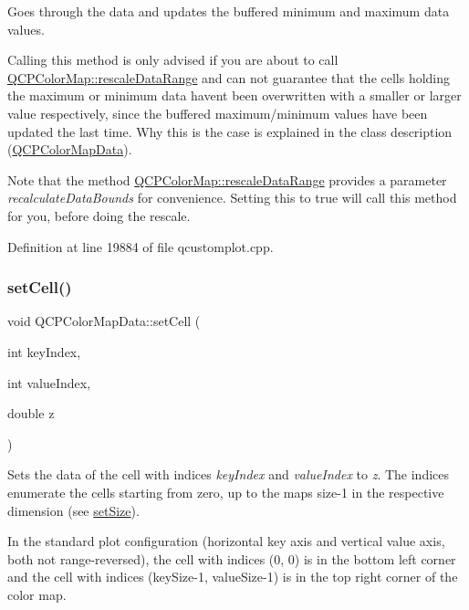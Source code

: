 Goes through the data and updates the buffered minimum and maximum data values.

Calling this method is only advised if you are about to call \hyperlink{class_q_c_p_color_map_a856608fa3dd1cc290bcd5f29a5575774}{Q\+C\+P\+Color\+Map\+::rescale\+Data\+Range} and can not guarantee that the cells holding the maximum or minimum data haven\textquotesingle{}t been overwritten with a smaller or larger value respectively, since the buffered maximum/minimum values have been updated the last time. Why this is the case is explained in the class description (\hyperlink{class_q_c_p_color_map_data}{Q\+C\+P\+Color\+Map\+Data}).

Note that the method \hyperlink{class_q_c_p_color_map_a856608fa3dd1cc290bcd5f29a5575774}{Q\+C\+P\+Color\+Map\+::rescale\+Data\+Range} provides a parameter {\itshape recalculate\+Data\+Bounds} for convenience. Setting this to true will call this method for you, before doing the rescale. 

Definition at line 19884 of file qcustomplot.\+cpp.

\mbox{\label{class_q_c_p_color_map_data_a8e75eaf8746596319032a93f3d2d0683}} 
\subsubsection{\texorpdfstring{set\+Cell()}{setCell()}}
{\footnotesize\ttfamily void Q\+C\+P\+Color\+Map\+Data\+::set\+Cell (\begin{DoxyParamCaption}\item[{int}]{key\+Index,  }\item[{int}]{value\+Index,  }\item[{double}]{z }\end{DoxyParamCaption})}

Sets the data of the cell with indices {\itshape key\+Index} and {\itshape value\+Index} to {\itshape z}. The indices enumerate the cells starting from zero, up to the map\textquotesingle{}s size-\/1 in the respective dimension (see \hyperlink{class_q_c_p_color_map_data_a0d9ff35c299d0478b682bfbcdd9c097e}{set\+Size}).

In the standard plot configuration (horizontal key axis and vertical value axis, both not range-\/reversed), the cell with indices (0, 0) is in the bottom left corner and the cell with indices (key\+Size-\/1, value\+Size-\/1) is in the top right corner of the color map.

